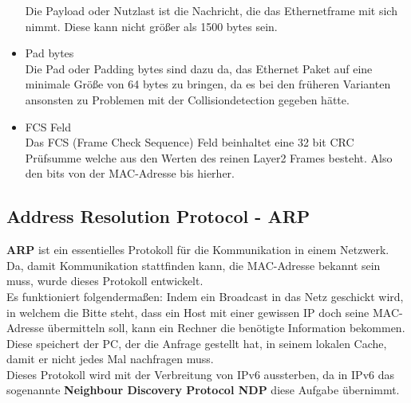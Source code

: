 \documentclass[12pt,a4paper]{report}
\begin{document}
\begin{onehalfspace}
\begin{itemize}
Die Payload oder Nutzlast ist die Nachricht, die das Ethernetframe mit sich nimmt. Diese kann nicht größer als 1500 bytes sein.
\item Pad bytes\\
Die Pad oder Padding bytes sind dazu da, das Ethernet Paket auf eine minimale Größe von 64 bytes zu bringen, da es bei den früheren Varianten ansonsten zu Problemen mit der Collisiondetection gegeben hätte.
\item FCS Feld\\
Das FCS (Frame Check Sequence) Feld beinhaltet eine 32 bit CRC Prüfsumme welche aus den Werten des reinen Layer2 Frames besteht. Also den bits von der MAC-Adresse bis hierher.
\end{itemize}

\subsection{Address Resolution Protocol - ARP}\label{ssec:arp}
\textbf{ARP} ist ein essentielles Protokoll für die Kommunikation in einem Netzwerk. Da, damit Kommunikation stattfinden kann, die MAC-Adresse bekannt sein muss, wurde dieses Protokoll entwickelt.\\
Es funktioniert folgendermaßen: Indem ein Broadcast in das Netz geschickt wird, in welchem die Bitte steht, dass ein Host mit einer gewissen IP doch seine MAC-Adresse übermitteln soll, kann ein Rechner die benötigte Information bekommen. Diese speichert der PC, der die Anfrage gestellt hat, in seinem lokalen Cache, damit er nicht jedes Mal nachfragen muss.\\
Dieses Protokoll wird mit der Verbreitung von IPv6 aussterben, da in IPv6 das sogenannte \textbf{Neighbour Discovery Protocol NDP} diese Aufgabe übernimmt.\\


\end{onehalfspace}
\end{document}
